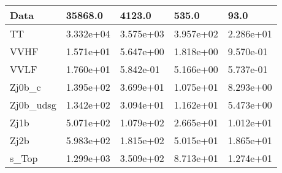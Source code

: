 \begin{table}
{\begin{tabularx}{\textwidth}{|X|X|X|X|X|}
\hline
Data & 35868.0 & 4123.0 & 535.0 & 93.0 \\
\hline
TT & 3.332e+04 & 3.575e+03 & 3.957e+02 & 2.286e+01 \\
VVHF & 1.571e+01 & 5.647e+00 & 1.818e+00 & 9.570e-01 \\
VVLF & 1.760e+01 & 5.842e-01 & 5.166e+00 & 5.737e-01 \\
Zj0b\_c & 1.395e+02 & 3.699e+01 & 1.075e+01 & 8.293e+00 \\
Zj0b\_udsg & 1.342e+02 & 3.094e+01 & 1.162e+01 & 5.473e+00 \\
Zj1b & 5.071e+02 & 1.079e+02 & 2.665e+01 & 1.012e+01 \\
Zj2b & 5.983e+02 & 1.815e+02 & 5.015e+01 & 1.865e+01 \\
s\_Top & 1.299e+03 & 3.509e+02 & 8.713e+01 & 1.274e+01 \\
\hline
\end{tabularx}
}
\label{tab:cr-Zmm-2018}
\end{table}

